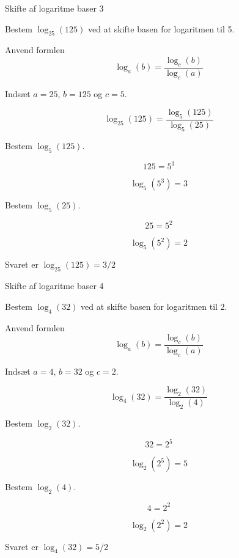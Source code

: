 \documentclass{article}
\begin{document}
\newpage
\begin{exercise}{Skifte af logaritme baser 3}

Bestem $\log_{25}(125)$ ved at skifte basen for logaritmen til 5.


\hint

Anvend formlen
\[
\log_a(b) = \frac{\log_c(b)}{\log_c(a)}
\]

\hint

Indsæt $a=25$, $b=125$ og $c=5$.

\hint
\[
\log_{25}(125) = \frac{\log_5(125)}{\log_5(25)}
\]

\hint
Bestem $\log_5(125)$.

\hint
\[
125 = 5^3
\]


\hint
\[
\log_5(5^3) = 3
\]

\hint
Bestem $\log_5(25)$.

\hint
\[
25 = 5^2
\]

\hint
\[
\log_5(5^2) = 2
\]

\hint
Svaret er $\log_{25}(125) = 3/2$


\end{exercise}

\newpage
\begin{exercise}{Skifte af logaritme baser 4}

Bestem $\log_{4}(32)$ ved at skifte basen for logaritmen til 2.


\hint

Anvend formlen
\[
\log_a(b) = \frac{\log_c(b)}{\log_c(a)}
\]

\hint

Indsæt $a=4$, $b=32$ og $c=2$.

\hint
\[
\log_{4}(32) = \frac{\log_2(32)}{\log_2(4)}
\]

\hint
Bestem $\log_2(32)$.

\hint
\[
32 = 2^5
\]


\hint
\[
\log_2(2^5) = 5
\]

\hint
Bestem $\log_2(4)$.

\hint
\[
4 = 2^2
\]

\hint
\[
\log_2(2^2) = 2
\]

\hint
Svaret er $\log_{4}(32) = 5/2$


\end{exercise}
\end{document}
